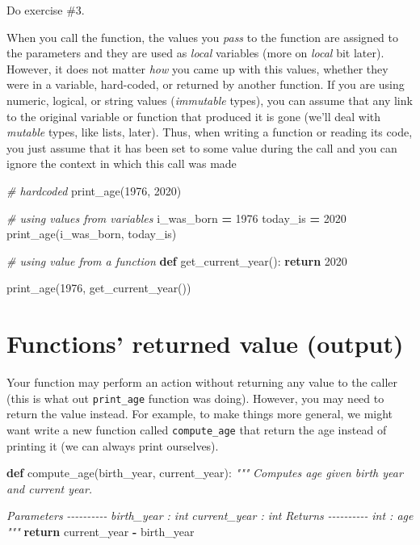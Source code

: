 \documentclass[
]{book}
\newenvironment{Shaded}{\begin{snugshade}}{\end{snugshade}}
\newcommand{\CommentTok}[1]{\textcolor[rgb]{0.56,0.35,0.01}{\textit{#1}}}
\newcommand{\ControlFlowTok}[1]{\textcolor[rgb]{0.13,0.29,0.53}{\textbf{#1}}}
\newcommand{\DecValTok}[1]{\textcolor[rgb]{0.00,0.00,0.81}{#1}}
\newcommand{\KeywordTok}[1]{\textcolor[rgb]{0.13,0.29,0.53}{\textbf{#1}}}
\newcommand{\NormalTok}[1]{#1}
\newcommand{\OperatorTok}[1]{\textcolor[rgb]{0.81,0.36,0.00}{\textbf{#1}}}
\begin{document}
Do exercise \#3.

When you call the function, the values you \emph{pass} to the function are assigned to the parameters and they are used as \emph{local} variables (more on \emph{local} bit later). However, it does not matter \emph{how} you came up with this values, whether they were in a variable, hard-coded, or returned by another function. If you are using numeric, logical, or string values (\emph{immutable} types), you can assume that any link to the original variable or function that produced it is gone (we'll deal with \emph{mutable} types, like lists, later). Thus, when writing a function or reading its code, you just assume that it has been set to some value during the call and you can ignore the context in which this call was made

\begin{Shaded}
\begin{Highlighting}[]
\CommentTok{\# hardcoded}
\NormalTok{print\_age(}\DecValTok{1976}\NormalTok{, }\DecValTok{2020}\NormalTok{)}

\CommentTok{\# using values from variables}
\NormalTok{i\_was\_born }\OperatorTok{=} \DecValTok{1976}
\NormalTok{today\_is }\OperatorTok{=} \DecValTok{2020}
\NormalTok{print\_age(i\_was\_born, today\_is)}

\CommentTok{\# using value from a function}
\KeywordTok{def}\NormalTok{ get\_current\_year():}
    \ControlFlowTok{return} \DecValTok{2020}

\NormalTok{print\_age(}\DecValTok{1976}\NormalTok{, get\_current\_year())}
\end{Highlighting}
\end{Shaded}

\hypertarget{functions-returned-value-output}{%
\section{Functions' returned value (output)}\label{functions-returned-value-output}}

Your function may perform an action without returning any value to the caller (this is what out \texttt{print\_age} function was doing). However, you may need to return the value instead. For example, to make things more general, we might want write a new function called \texttt{compute\_age} that return the age instead of printing it (we can always print ourselves).

\begin{Shaded}
\begin{Highlighting}[]
\KeywordTok{def}\NormalTok{ compute\_age(birth\_year, current\_year):}
    \CommentTok{"""}
\CommentTok{    Computes age given birth year and current year.}

\CommentTok{    Parameters}
\CommentTok{    {-}{-}{-}{-}{-}{-}{-}{-}{-}{-}}
\CommentTok{    birth\_year : int}
\CommentTok{    current\_year : int}
\CommentTok{    }
\CommentTok{    Returns}
\CommentTok{    {-}{-}{-}{-}{-}{-}{-}{-}{-}{-}}
\CommentTok{    int : age}
\CommentTok{    """}
    \ControlFlowTok{return}\NormalTok{ current\_year }\OperatorTok{{-}}\NormalTok{ birth\_year}
\end{Highlighting}
\end{Shaded}
\end{document}
